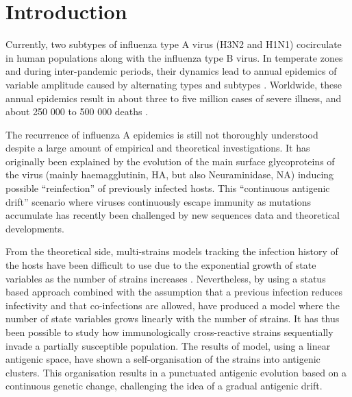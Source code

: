 
\section{Introduction}

Currently, two subtypes of influenza type A virus (H3N2 and H1N1)
cocirculate in human populations along with the influenza type B
virus. In temperate zones and during inter-pandemic periods, their
dynamics lead to annual epidemics of variable amplitude caused by
alternating types and subtypes \citep{Nelson2007}. Worldwide, these
annual epidemics result in about three to five million cases of severe
illness, and about 250 000 to 500 000 deaths \citep{WHO2003}.

The recurrence of influenza A epidemics is still not thoroughly
understood despite a large amount of empirical and theoretical
investigations. It has originally been explained by the evolution of
the main surface glycoproteins of the virus (mainly haemagglutinin,
HA, but also Neuraminidase, NA) inducing possible “reinfection” of
previously infected hosts. This ``continuous antigenic drift''
scenario \citep{Pease1987} where viruses continuously escape immunity
as mutations accumulate has recently been challenged by new sequences
data and theoretical developments.

From the theoretical side, multi-strains models tracking the infection
history of the hosts have been difficult to use due to the exponential
growth of state variables as the number of strains increases
\citep{Andreasen1997}. Nevertheless, by using a status based approach
combined with the assumption that a previous infection reduces
infectivity and that co-infections are allowed, \citet{Gog2002} have
produced a model where the number of state variables grows linearly
with the number of strains. It has thus been possible to study how
immunologically cross-reactive strains sequentially invade a partially
susceptible population. The results of \citet{Gog2002} model, using a
linear antigenic space, have shown a self-organisation of the strains
into antigenic clusters. This organisation results in a punctuated
antigenic evolution based on a continuous genetic change, challenging
the idea of a gradual antigenic drift.

